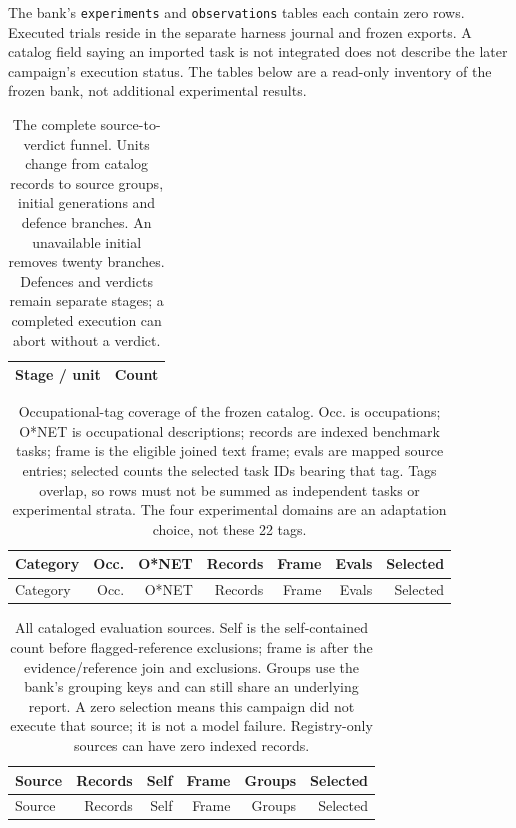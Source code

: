 The bank's \texttt{experiments} and \texttt{observations} tables each contain
zero rows. Executed trials reside in the separate harness journal and frozen
exports. A catalog field saying an imported task is not integrated does not
describe the later campaign's execution status. The tables below are a
read-only inventory of the frozen bank, not additional experimental results.

\begin{table}[htbp]
\centering\small
\begin{tabular}{lr}
\toprule
Stage / unit & Count\\\midrule

\bottomrule
\end{tabular}
\caption{The complete source-to-verdict funnel. Units change from catalog
records to source groups, initial generations and defence branches. An
unavailable initial removes twenty branches. Defences and verdicts remain
separate stages; a completed execution can abort without a verdict.}
\label{tab:diagnostic-flow}
\end{table}

\begingroup\small\setlength{\tabcolsep}{3pt}
\begin{longtable}{>{\raggedright\arraybackslash}p{.36\linewidth}rrrrrr}
\caption{Occupational-tag coverage of the frozen catalog. Occ. is occupations;
O*NET is occupational descriptions; records are indexed benchmark tasks;
frame is the eligible joined text frame; evals are mapped source entries;
selected counts the selected task IDs bearing that tag. Tags overlap, so
rows must not be summed as independent tasks or experimental strata. The
four experimental domains are an adaptation choice, not these 22 tags.}
\label{tab:diagnostic-categories}\\
\toprule Category & Occ. & O*NET & Records & Frame & Evals & Selected\\\midrule\endfirsthead
\toprule Category & Occ. & O*NET & Records & Frame & Evals & Selected\\\midrule\endhead

\bottomrule
\end{longtable}
\endgroup

\begingroup\small\setlength{\tabcolsep}{4pt}
\begin{longtable}{>{\raggedright\arraybackslash}p{.39\linewidth}rrrrr}
\caption{All cataloged evaluation sources. Self is the self-contained count
before flagged-reference exclusions; frame is after the evidence/reference
join and exclusions. Groups use the bank's grouping keys and can still share
an underlying report. A zero selection means this campaign did not execute
that source; it is not a model failure. Registry-only sources can have zero
indexed records.}
\label{tab:diagnostic-benchmarks}\\
\toprule Source & Records & Self & Frame & Groups & Selected\\\midrule\endfirsthead
\toprule Source & Records & Self & Frame & Groups & Selected\\\midrule\endhead

\bottomrule
\end{longtable}
\endgroup

